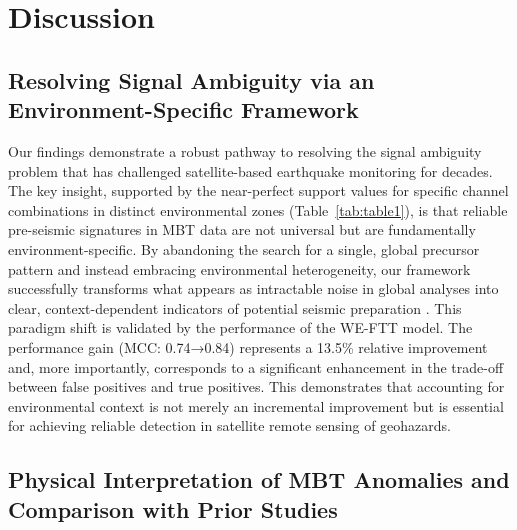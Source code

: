\documentclass[preprint,review,12pt,authoryear]{elsarticle}
\providecommand{\DIFaddend}{} %
\DeclareRobustCommand{\DIFaddend}{\DIFOaddend \let\includegraphics\DIFOincludegraphics} %
\begin{document}
\DIFaddend \section{Discussion}\label{sec:discussion}

\subsection{Resolving Signal Ambiguity via an Environment-Specific Framework}\label{sec:discuss_ambiguity}

Our findings demonstrate a robust pathway to resolving the signal ambiguity problem that has challenged satellite-based earthquake monitoring for decades. The key insight, supported by the near-perfect support values for specific channel combinations in distinct environmental zones (Table~\ref{tab:table1}), is that reliable pre-seismic signatures in MBT data are not universal but are fundamentally environment-specific. By abandoning the search for a single, global precursor pattern and instead embracing environmental heterogeneity, our framework successfully transforms what appears as intractable noise in global analyses into clear, context-dependent indicators of potential seismic preparation \citep{qiSpatiotemporallyWeightedTwostep2020,qiMicrowaveBrightnessTemperature2022,wuIdentifyingSeismicAnomalies2024}. This paradigm shift is validated by the performance of the WE-FTT model. The performance gain (MCC: 0.74→0.84) represents a 13.5\% relative improvement and, more importantly, corresponds to a significant enhancement in the trade-off between false positives and true positives. This demonstrates that accounting for environmental context is not merely an incremental improvement but is essential for achieving reliable detection in satellite remote sensing of geohazards.

\subsection{Physical Interpretation of MBT Anomalies and Comparison with Prior Studies}\label{sec:discuss_physical}
\end{document}
